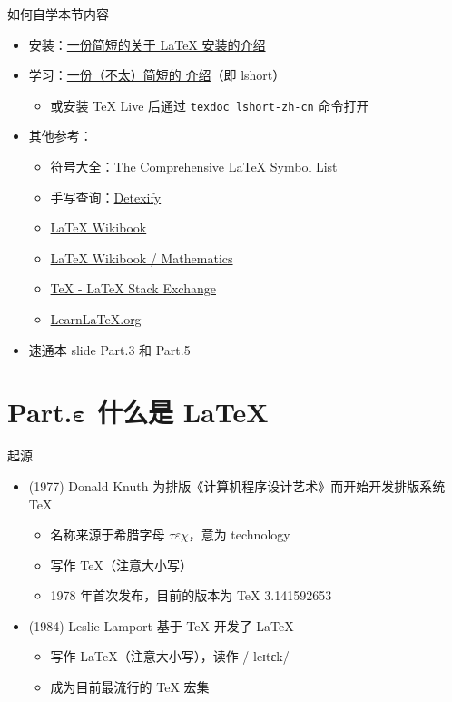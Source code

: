 \documentclass[aspectratio=43]{ctexbeamer}
\begin{document}
\begin{frame}{如何自学本节内容} \label{how-to-learn}
\begin{itemize}
    \item 安装：\href{https://github.com/OsbertWang/install-latex-guide-zh-cn}{一份简短的关于 \LaTeX{} 安装的介绍}
    \item 学习：\href{https://github.com/CTeX-org/lshort-zh-cn}{一份（不太）简短的 \LaTeXe{} 介绍}（即 lshort）
        \begin{itemize}
            \item 或安装 TeX Live 后通过 \texttt{texdoc lshort-zh-cn} 命令打开
        \end{itemize}
    \item 其他参考：
        \begin{itemize}
            \item 符号大全：\href{https://www.ctan.org/pkg/comprehensive}{The Comprehensive \LaTeX{} Symbol List}
            \item 手写查询：\href{http://detexify.kirelabs.org/classify.html}{Detexify}
            \item \href{https://en.wikibooks.org/wiki/LaTeX}{\LaTeX{} Wikibook}
            \item \href{https://en.wikibooks.org/wiki/LaTeX/Mathematics}{\LaTeX{} Wikibook / Mathematics}
            \item \href{https://tex.stackexchange.com/}{\TeX{} - \LaTeX{} Stack Exchange}
            \item \href{https://www.learnlatex.org/en/}{Learn\LaTeX{}.org}
        \end{itemize}
    \item 速通本 slide Part.3 和 Part.5
\end{itemize}
\end{frame}

\section{Part.\texorpdfstring{$\boldsymbol{\varepsilon}$}{ε} 什么是 \LaTeX{}}

\begin{frame}{起源}
\begin{itemize}
    \item (1977) Donald Knuth 为排版《计算机程序设计艺术》而开始开发排版系统 \TeX{}
    \begin{itemize}
        \item 名称来源于希腊字母 $\tau\varepsilon\chi$，意为 technology
        \item 写作 TeX（注意大小写）
        \item 1978 年首次发布，目前的版本为 \TeX{} 3.141592653
    \end{itemize}
    \item (1984) Leslie Lamport 基于 \TeX{} 开发了 \LaTeX{}
    \begin{itemize}
        \item 写作 LaTeX（注意大小写），读作 /ˈleɪtɛk/
        \item \LaTeXe{} 成为目前最流行的 \TeX{} 宏集
    \end{itemize}
\end{itemize}
\end{frame}
\end{document}
